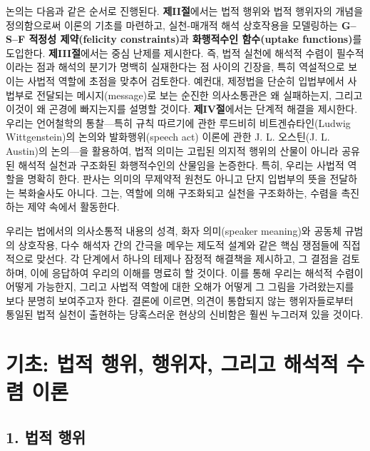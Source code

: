 \documentclass[12pt,a4paper]{article}
\begin{document}
논의는 다음과 같은 순서로 진행된다. \textbf{제II절}에서는 법적 행위와
법적 행위자의 개념을 정의함으로써 이론의 기초를 마련하고, 실천-매개적
해석 상호작용을 모델링하는 \textbf{G--S--F 적정성 제약(felicity
constraints)}과 \textbf{화행적수인 함수(uptake functions)}를 도입한다.
\textbf{제III절}에서는 중심 난제를 제시한다. 즉, 법적 실천에 해석적
수렴이 필수적이라는 점과 해석의 분기가 명백히 실재한다는 점 사이의
긴장을, 특히 역설적으로 보이는 사법적 역할에 초점을 맞추어 검토한다.
예컨대, 제정법을 단순히 입법부에서 사법부로 전달되는 메시지(message)로
보는 순진한 의사소통관은 왜 실패하는지, 그리고 이것이 왜 곤경에
빠지는지를 설명할 것이다. \textbf{제IV절}에서는 단계적 해결을 제시한다.
우리는 언어철학의 통찰---특히 규칙 따르기에 관한 루드비히
비트겐슈타인(Ludwig Wittgenstein)의 논의와 발화행위(speech act) 이론에
관한 J. L. 오스틴(J. L. Austin)의 논의---을 활용하여, 법적 의미는 고립된
의지적 행위의 산물이 아니라 공유된 해석적 실천과 구조화된 화행적수인의
산물임을 논증한다. 특히, 우리는 사법적 역할을 명확히 한다. 판사는 의미의
무제약적 원천도 아니고 단지 입법부의 뜻을 전달하는 복화술사도 아니다.
그는, 역할에 의해 구조화되고 실천을 구조화하는, 수렴을 촉진하는 제약
속에서 활동한다.

우리는 법에서의 의사소통적 내용의 성격, 화자 의미(speaker meaning)와
공동체 규범의 상호작용, 다수 해석자 간의 간극을 메우는 제도적 설계와
같은 핵심 쟁점들에 직접적으로 맞선다. 각 단계에서 하나의 테제나 잠정적
해결책을 제시하고, 그 결점을 검토하며, 이에 응답하여 우리의 이해를
명료히 할 것이다. 이를 통해 우리는 해석적 수렴이 어떻게 가능한지, 그리고
사법적 역할에 대한 오해가 어떻게 그 그림을 가려왔는지를 보다 분명히
보여주고자 한다. 결론에 이르면, 의견이 통합되지 않는 행위자들로부터
통일된 법적 실천이 출현하는 당혹스러운 현상의 신비함은 훨씬 누그러져
있을 것이다.

\section{기초: 법적 행위, 행위자, 그리고 해석적 수렴
이론}

\subsection{1. 법적 행위}
\end{document}
